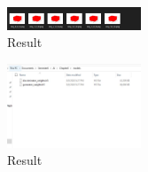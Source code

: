 \begin{enumerate}
        \begin{figure}[H]
            \centering
            \includegraphics[width=4cm]{figures/1174057/chapter8/27_3.PNG}
            \caption{Result}
        \end{figure}
        
        \begin{figure}[H]
            \centering
            \includegraphics[width=4cm]{figures/1174057/chapter8/27_4.jpg}
            \caption{Result}
        \end{figure}
        
        
        \end{enumerate}